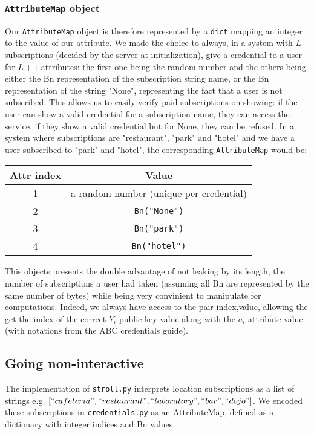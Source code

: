 \documentclass[10pt,conference,compsocconf]{IEEEtran}
\begin{document}
\subsubsection{\texttt{AttributeMap} object}
Our \texttt{AttributeMap} object is therefore represented by a \texttt{dict} mapping an integer to the value of our attribute. We made the choice to always, in a system with $L$ subscriptions (decided by the server at initialization), give a credential to a user for $L+1$ attributes: the first one being the random number and the others being either the Bn representation of the subscription string name, or the Bn representation of the string "None", representing the fact that a user is not subscribed. This allows us to easily verify paid subscriptions on showing: if the user can show a valid credential for a subscription name, they can access the service, if they show a valid credential but for None, they can be refused. In a system where subscriptions are "restaurant", "park" and "hotel" and we have a user subscribed to "park" and "hotel", the corresponding \texttt{AttributeMap} would be:
\begin{center}
\begin{tabular}{||c c||} 
 \hline
 Attr index & Value \\ [0.5ex] 
 \hline\hline
 1 & a random number (unique per credential) \\ 
 \hline
 2 & \texttt{Bn("None")} \\
 \hline
 3 & \texttt{Bn("park")} \\
 \hline
 4 & \texttt{Bn("hotel")} \\
 \hline
\end{tabular}
\end{center}
This objects presents the double advantage of not leaking by its length, the number of subscriptions a user had taken (assuming all Bn are represented by the same number of bytes) while being very convinient to manipulate for computations. Indeed, we always have access to the pair index,value, allowing the get the index of the correct $Y_i$ public key value along with the $a_i$ attribute value (with notations from the ABC credentials guide).
\subsection{Going non-interactive}

The implementation of \texttt{stroll.py} interprets location subscriptions as a list of strings e.g. $[``cafeteria", ``restaurant", ``laboratory", ``bar", ``dojo"]$. 
We encoded these subscriptions in \texttt{credentials.py} as an AttributeMap, defined as a dictionary with integer indices and Bn values. 
\end{document}
